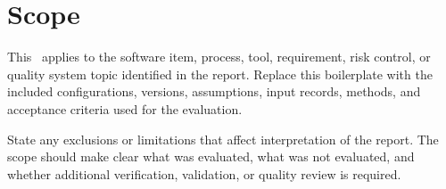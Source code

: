 \section{Scope}
This \stdTechReport\ applies to the software item, process, tool, requirement,
risk control, or quality system topic identified in the report.  Replace this
boilerplate with the included configurations, versions, assumptions, input
records, methods, and acceptance criteria used for the evaluation.

\tlcVspace

State any exclusions or limitations that affect interpretation of the report.
The scope should make clear what was evaluated, what was not evaluated, and
whether additional verification, validation, or quality review is required.
